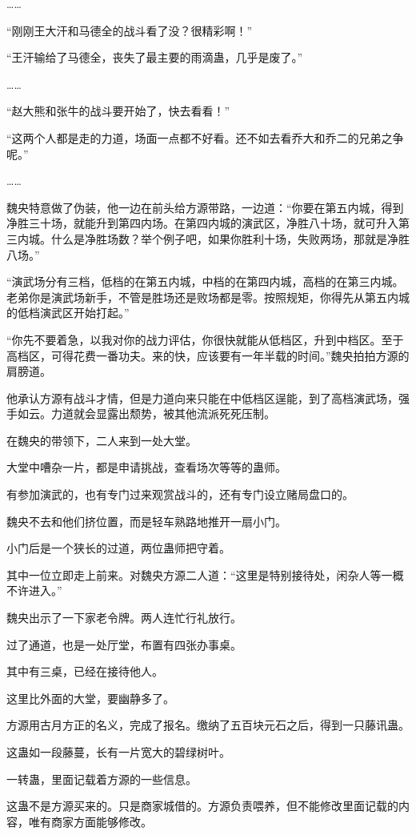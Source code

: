 \begin{this_body}
……

“刚刚王大汗和马德全的战斗看了没？很精彩啊！”

“王汗输给了马德全，丧失了最主要的雨滴蛊，几乎是废了。”

……

“赵大熊和张牛的战斗要开始了，快去看看！”

“这两个人都是走的力道，场面一点都不好看。还不如去看乔大和乔二的兄弟之争呢。”

……

魏央特意做了伪装，他一边在前头给方源带路，一边道：“你要在第五内城，得到净胜三十场，就能升到第四内场。在第四内城的演武区，净胜八十场，就可升入第三内城。什么是净胜场数？举个例子吧，如果你胜利十场，失败两场，那就是净胜八场。”

“演武场分有三档，低档的在第五内城，中档的在第四内城，高档的在第三内城。老弟你是演武场新手，不管是胜场还是败场都是零。按照规矩，你得先从第五内城的低档演武区开始打起。”

“你先不要着急，以我对你的战力评估，你很快就能从低档区，升到中档区。至于高档区，可得花费一番功夫。来的快，应该要有一年半载的时间。”魏央拍拍方源的肩膀道。

他承认方源有战斗才情，但是力道向来只能在中低档区逞能，到了高档演武场，强手如云。力道就会显露出颓势，被其他流派死死压制。

在魏央的带领下，二人来到一处大堂。

大堂中嘈杂一片，都是申请挑战，查看场次等等的蛊师。

有参加演武的，也有专门过来观赏战斗的，还有专门设立赌局盘口的。

魏央不去和他们挤位置，而是轻车熟路地推开一扇小门。

小门后是一个狭长的过道，两位蛊师把守着。

其中一位立即走上前来。对魏央方源二人道：“这里是特别接待处，闲杂人等一概不许进入。”

魏央出示了一下家老令牌。两人连忙行礼放行。

过了通道，也是一处厅堂，布置有四张办事桌。

其中有三桌，已经在接待他人。

这里比外面的大堂，要幽静多了。

方源用古月方正的名义，完成了报名。缴纳了五百块元石之后，得到一只藤讯蛊。

这蛊如一段藤蔓，长有一片宽大的碧绿树叶。

一转蛊，里面记载着方源的一些信息。

这蛊不是方源买来的。只是商家城借的。方源负责喂养，但不能修改里面记载的内容，唯有商家方面能够修改。


\end{this_body}
